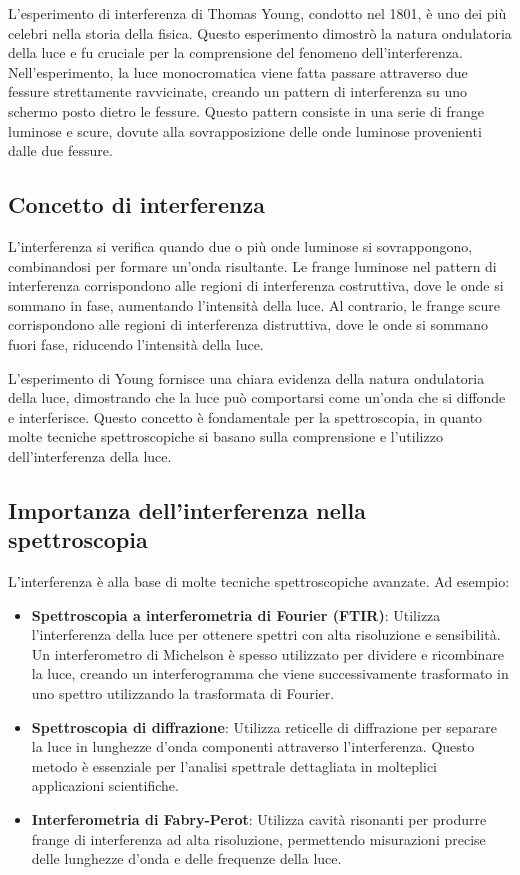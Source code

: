 \documentclass[12pt,a4paper]{report}
\begin{document}
L'esperimento di interferenza di Thomas Young, condotto nel 1801, è uno dei più celebri nella storia della fisica. Questo esperimento dimostrò la natura ondulatoria della luce e fu cruciale per la comprensione del fenomeno dell'interferenza. Nell'esperimento, la luce monocromatica viene fatta passare attraverso due fessure strettamente ravvicinate, creando un pattern di interferenza su uno schermo posto dietro le fessure. Questo pattern consiste in una serie di frange luminose e scure, dovute alla sovrapposizione delle onde luminose provenienti dalle due fessure.

\subsection{Concetto di interferenza}

L'interferenza si verifica quando due o più onde luminose si sovrappongono, combinandosi per formare un'onda risultante. Le frange luminose nel pattern di interferenza corrispondono alle regioni di interferenza costruttiva, dove le onde si sommano in fase, aumentando l'intensità della luce. Al contrario, le frange scure corrispondono alle regioni di interferenza distruttiva, dove le onde si sommano fuori fase, riducendo l'intensità della luce.

L'esperimento di Young fornisce una chiara evidenza della natura ondulatoria della luce, dimostrando che la luce può comportarsi come un'onda che si diffonde e interferisce. Questo concetto è fondamentale per la spettroscopia, in quanto molte tecniche spettroscopiche si basano sulla comprensione e l'utilizzo dell'interferenza della luce.

\subsection{Importanza dell'interferenza nella spettroscopia}

L'interferenza è alla base di molte tecniche spettroscopiche avanzate. Ad esempio:

\begin{itemize}
\item \textbf{Spettroscopia a interferometria di Fourier (FTIR)}: Utilizza l'interferenza della luce per ottenere spettri con alta risoluzione e sensibilità. Un interferometro di Michelson è spesso utilizzato per dividere e ricombinare la luce, creando un interferogramma che viene successivamente trasformato in uno spettro utilizzando la trasformata di Fourier.
\item \textbf{Spettroscopia di diffrazione}: Utilizza reticelle di diffrazione per separare la luce in lunghezze d'onda componenti attraverso l'interferenza. Questo metodo è essenziale per l'analisi spettrale dettagliata in molteplici applicazioni scientifiche.
\item \textbf{Interferometria di Fabry-Perot}: Utilizza cavità risonanti per produrre frange di interferenza ad alta risoluzione, permettendo misurazioni precise delle lunghezze d'onda e delle frequenze della luce.
\end{itemize}
\end{document}
